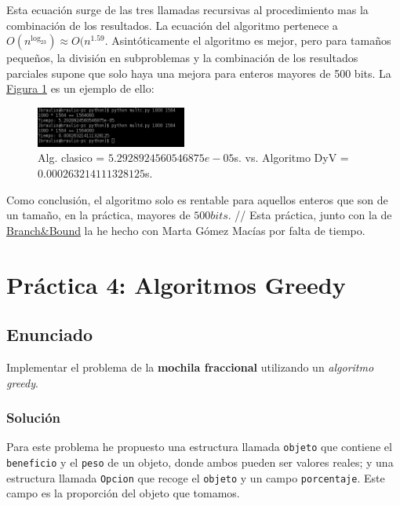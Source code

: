 \documentclass[10pt,a4paper,spanish]{report}
\begin{document}
Esta ecuación surge de las tres llamadas recursivas al procedimiento mas la combinación de los resultados. La ecuación del algoritmo pertenece a $O(n^{\log_23}) \approx O(n^{1.59}$. Asintóticamente el algoritmo es mejor, pero para tamaños pequeños, la división en subproblemas y la combinación de los resultados parciales supone que solo haya una mejora para enteros mayores de 500 bits. La \hyperref[figura2]{Figura \ref*{figura2}} es un ejemplo de ello:

\begin{center}
\begin{figure}[!h]
\centering
\includegraphics[width=0.44\textwidth]{figura2}
\caption{Alg. clasico = $5.2928924560546875e-05$s. vs. Algoritmo DyV = $0.000263214111328125$s.}
\label{figura2}
\end{figure}
\end{center}


Como conclusión, el algoritmo solo es rentable para aquellos enteros que son de un tamaño, en la práctica, mayores de $500bits$.
//
Esta práctica, junto con la de \hyperref[bb]{Branch\&Bound} la he hecho con Marta Gómez Macías por falta de tiempo.

\chapter{\textcolor[rgb]{0.1,0.2,1}Práctica 4: \textcolor[rgb]{0.1,0.2,1}Algoritmos \textcolor[rgb]{0.1,0.2,1}Greedy}

\section{\textcolor[rgb]{0.1,0.2,1}Enunciado}

Implementar el problema de la \textbf{\textcolor[rgb]{0.1,0.2,1}{mochila fraccional}} utilizando un \textit{\textcolor[rgb]{0.1,0.2,1}{algoritmo greedy}}.

\subsection{\textcolor[rgb]{0.1,0.2,1}Solución}

Para este problema he propuesto una estructura llamada \verb|objeto| que contiene el \verb|beneficio| y el \verb|peso| de un objeto, donde ambos pueden ser valores reales; y una estructura llamada \verb|Opcion| que recoge el \verb|objeto| y un campo \verb|porcentaje|. Este campo es la proporción del objeto que tomamos.
\end{document}
